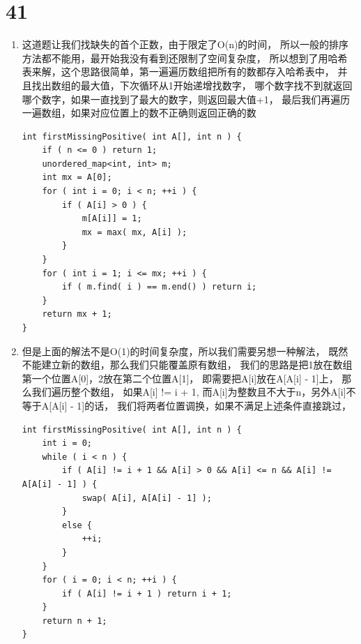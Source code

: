 \documentclass[12pt,a4paper]{article}
\begin{document}
\section{41}
\begin{enumerate}
\item
\begin{CJK}{UTF8}{gbsn}
这道题让我们找缺失的首个正数，由于限定了O(n)的时间，
所以一般的排序方法都不能用，最开始我没有看到还限制了空间复杂度，
所以想到了用哈希表来解，这个思路很简单，第一遍遍历数组把所有的数都存入哈希表中，
并且找出数组的最大值，下次循环从1开始递增找数字，
哪个数字找不到就返回哪个数字，如果一直找到了最大的数字，则返回最大值+1，
最后我们再遍历一遍数组，如果对应位置上的数不正确则返回正确的数
\end{CJK}
\begin{lstlisting}
int firstMissingPositive( int A[], int n ) {
	if ( n <= 0 ) return 1;
	unordered_map<int, int> m;
	int mx = A[0];
	for ( int i = 0; i < n; ++i ) {
		if ( A[i] > 0 ) {
			m[A[i]] = 1;
			mx = max( mx, A[i] );
		}
	}
	for ( int i = 1; i <= mx; ++i ) {
		if ( m.find( i ) == m.end() ) return i;
	}
	return mx + 1;
}
\end{lstlisting}
\item
\begin{CJK}{UTF8}{gbsn}
但是上面的解法不是O(1)的时间复杂度，所以我们需要另想一种解法，
既然不能建立新的数组，那么我们只能覆盖原有数组，
我们的思路是把1放在数组第一个位置A[0]，2放在第二个位置A[1]，
即需要把A[i]放在A[A[i] - 1]上，
那么我们遍历整个数组，
如果A[i] != i + 1, 而A[i]为整数且不大于n，另外A[i]不等于A[A[i] - 1]的话，
我们将两者位置调换，如果不满足上述条件直接跳过，
\end{CJK}
\begin{lstlisting}
int firstMissingPositive( int A[], int n ) {
	int i = 0;
	while ( i < n ) {
		if ( A[i] != i + 1 && A[i] > 0 && A[i] <= n && A[i] != A[A[i] - 1] ) {
			swap( A[i], A[A[i] - 1] );
		}
		else {
			++i;
		}
	}
	for ( i = 0; i < n; ++i ) {
		if ( A[i] != i + 1 ) return i + 1;
	}
	return n + 1;
}
\end{lstlisting}
\end{enumerate}
\end{document}
